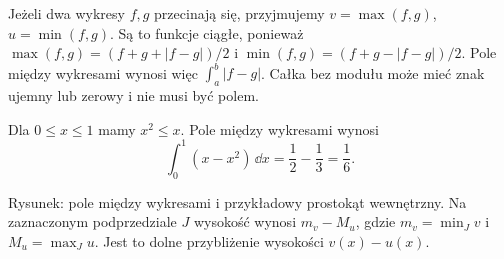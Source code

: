 Jeżeli dwa wykresy $f,g$ przecinają się, przyjmujemy $v=\max(f,g)$, $u=\min(f,g)$. Są to funkcje ciągłe, ponieważ $\max(f,g)=(f+g+|f-g|)/2$ i $\min(f,g)=(f+g-|f-g|)/2$. Pole między wykresami wynosi więc $\int_a^b|f-g|$. Całka bez modułu może mieć znak ujemny lub zerowy i nie musi być polem.

\begin{przyklad}
\label{ma1:ex:area-parabola}
Dla $0\le x\le1$ mamy $x^2\le x$. Pole między wykresami wynosi
\[
 \int_0^1(x-x^2)\,\dd x=\frac12-\frac13=\frac16.
\]
\end{przyklad}
\begin{center}

\small Rysunek: pole między wykresami i przykładowy prostokąt wewnętrzny. Na zaznaczonym podprzedziale $J$ wysokość wynosi $m_v-M_u$, gdzie $m_v=\min_Jv$ i $M_u=\max_Ju$. Jest to dolne przybliżenie wysokości $v(x)-u(x)$.
\end{center}


